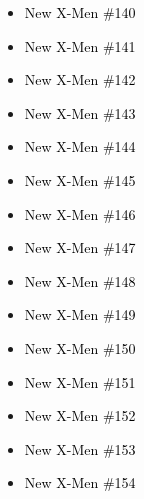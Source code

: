 \documentclass[12pt]{article}
\newcommand{\checkbox}{\raisebox{0.0ex}{\fbox{\rule{0ex}{1.5ex} \rule{1.5ex}{0ex}}}}
\begin{document}
\vspace{0.3cm}
\noindent
\begin{tcolorbox}[
  colback=white!95!gray,
  colframe=black,
  width=\textwidth,
  arc=4mm,
  auto outer arc,
  boxrule=0.8pt,
  left=8pt,right=8pt,top=8pt,bottom=8pt
]
\begin{itemize}[left=0pt,label={\checkbox}]
  \item \textcolor{black}{New X-Men \#140}
  \item \textcolor{black}{New X-Men \#141}
  \item \textcolor{black}{New X-Men \#142}
  \item \textcolor{black}{New X-Men \#143}
  \item \textcolor{black}{New X-Men \#144}
  \item \textcolor{black}{New X-Men \#145}
  \item \textcolor{black}{New X-Men \#146}
  \item \textcolor{black}{New X-Men \#147}
  \item \textcolor{black}{New X-Men \#148}
  \item \textcolor{black}{New X-Men \#149}
  \item \textcolor{black}{New X-Men \#150}
  \item \textcolor{black}{New X-Men \#151}
  \item \textcolor{black}{New X-Men \#152}
  \item \textcolor{black}{New X-Men \#153}
  \item \textcolor{black}{New X-Men \#154}
\end{itemize}
\end{tcolorbox}

\newpage
{}
\end{document}
